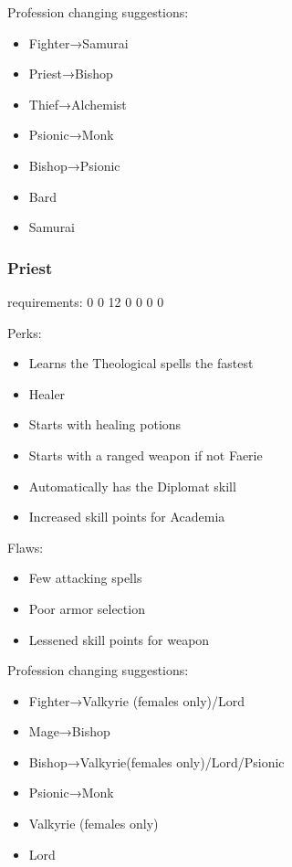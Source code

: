 \documentclass[12pt]{article}
\begin{document}
Profession changing suggestions:

\begin{itemize}
\item
  Fighter→Samurai
\item
  Priest→Bishop
\item
  Thief→Alchemist
\item
  Psionic→Monk
\item
  Bishop→Psionic
\item
  Bard
\item
  Samurai
\end{itemize}

\subsubsection{Priest}\label{priest}

requirements: 0 0 12 0 0 0 0

Perks:

\begin{itemize}
\item
  Learns the Theological spells the fastest
\item
  Healer
\item
  Starts with healing potions
\item
  Starts with a ranged weapon if not Faerie
\item
  Automatically has the Diplomat skill
\item
  Increased skill points for Academia
\end{itemize}

Flaws:

\begin{itemize}
\item
  Few attacking spells
\item
  Poor armor selection
\item
  Lessened skill points for weapon
\end{itemize}

Profession changing suggestions:

\begin{itemize}
\item
  Fighter→Valkyrie (females only)/Lord
\item
  Mage→Bishop
\item
  Bishop→Valkyrie(females only)/Lord/Psionic
\item
  Psionic→Monk
\item
  Valkyrie (females only)
\item
  Lord
\end{itemize}
\end{document}
